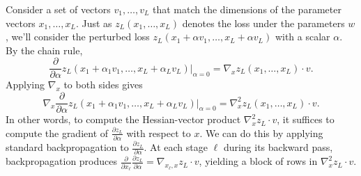\documentclass{article}
\begin{document}
Consider a set of vectors $v_1,\ldots,v_L$ that match the dimensions of the parameter vectors $x_1,\ldots,x_L$. Just as
$z_L(x_1,\ldots,x_L)$ denotes the loss under the parameters $w$, we'll consider the perturbed loss $z_L(x_1+\alpha v_1,
  \ldots, x_L+\alpha v_L)$ with a scalar $\alpha$. By the chain rule,
\begin{equation}
  \frac{\partial}{\partial \alpha} z_L(x_1+\alpha_1 v_1, \ldots, x_L+\alpha_L v_L) \bigg|_{\alpha=0} =
  \nabla_x z_L(x_1, \ldots, x_L) \cdot v.
\end{equation}
Applying $\nabla_x$ to both sides gives
\begin{equation}
  \nabla_x \frac{\partial}{\partial \alpha} z_L(x_1+\alpha_1 v_1, \ldots, x_L+\alpha_L v_L) \bigg|_{\alpha=0} =
  \nabla_x^2 z_L(x_1, \ldots, x_L) \cdot v.
\end{equation}
In other words, to compute the Hessian-vector product $\nabla_x^2 z_L \cdot v$,
it suffices to compute the gradient of $\frac{\partial z_L}{\partial \alpha} $
with respect to $x$.  We can do this by applying standard backpropagation
to $\frac{\partial z_L}{\partial \alpha}$. At each stage $\ell$ during its
backward pass, backpropagation produces $\frac{\partial}{\partial x_\ell}
  \frac{\partial z_L}{\partial \alpha} = \nabla_{x_\ell, x} z_L \cdot v$, yielding
a block of rows in $\nabla_x^2 z_L \cdot v$.
\end{document}
